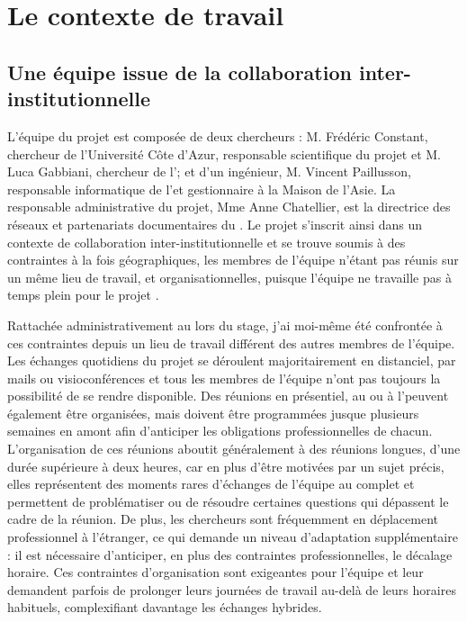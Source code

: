 \section{Le contexte de travail}
    \subsection{Une équipe issue de la collaboration inter-institutionnelle}

L'équipe du projet \COREL est composée de deux chercheurs : M. Frédéric Constant, chercheur de l'Université Côte d'Azur, responsable scientifique du projet et M. Luca Gabbiani, chercheur de l'\EFEO ; et d'un ingénieur, M. Vincent Paillusson, responsable informatique de l'\EFEO et gestionnaire à la Maison de l'Asie. La responsable administrative du projet, Mme Anne Chatellier, est la directrice des réseaux et partenariats documentaires du \cdf. Le projet s'inscrit ainsi dans un contexte de collaboration inter-institutionnelle et se trouve soumis à des contraintes à la fois géographiques, les membres de l'équipe n'étant pas réunis sur un même lieu de travail, et organisationnelles, puisque l'équipe ne travaille pas à temps plein pour le projet \COREL. 

Rattachée administrativement au \cdf lors du stage, j'ai moi-même été confrontée à ces contraintes depuis un lieu de travail différent des autres membres de l'équipe. Les échanges quotidiens du projet se déroulent majoritairement en distanciel, par mails ou visioconférences et tous les membres de l'équipe n'ont pas toujours la possibilité de se rendre disponible. Des réunions en présentiel, au \cdf ou à l'\EFEO peuvent également être organisées, mais doivent être programmées jusque plusieurs semaines en amont afin d'anticiper les obligations professionnelles de chacun. L'organisation de ces réunions aboutit généralement à des réunions longues, d'une durée supérieure à deux heures, car en plus d'être motivées par un sujet précis, elles représentent des moments rares d'échanges de l'équipe au complet et permettent de problématiser ou de résoudre certaines questions qui dépassent le cadre de la réunion. De plus, les chercheurs sont fréquemment en déplacement professionnel à l'étranger, ce qui demande un niveau d'adaptation supplémentaire : il est nécessaire d'anticiper, en plus des contraintes professionnelles, le décalage horaire. Ces contraintes d'organisation sont exigeantes pour l'équipe et leur demandent parfois de prolonger leurs journées de travail au-delà de leurs horaires habituels, complexifiant davantage les échanges hybrides.  

